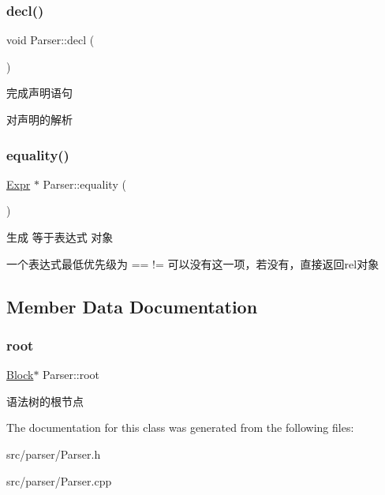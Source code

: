 \subsubsection{\texorpdfstring{decl()}{decl()}}
{\footnotesize\ttfamily void Parser\+::decl (\begin{DoxyParamCaption}{ }\end{DoxyParamCaption})\hspace{0.3cm}{\ttfamily [protected]}}



完成声明语句 

对声明的解析 \mbox{\label{class_parser_acf81bd28478a78855da7271b0dd7a09d}} 
\subsubsection{\texorpdfstring{equality()}{equality()}}
{\footnotesize\ttfamily \hyperlink{class_expr}{Expr} $\ast$ Parser\+::equality (\begin{DoxyParamCaption}{ }\end{DoxyParamCaption})\hspace{0.3cm}{\ttfamily [protected]}}



生成 等于表达式 对象 

一个表达式最低优先级为 == != 可以没有这一项，若没有，直接返回rel对象

\subsection{Member Data Documentation}
\mbox{\label{class_parser_a2c2aa893bb15b76ceea0330cad0c75cb}} 
\subsubsection{\texorpdfstring{root}{root}}
{\footnotesize\ttfamily \hyperlink{class_block}{Block}$\ast$ Parser\+::root\hspace{0.3cm}{\ttfamily [protected]}}

语法树的根节点 

The documentation for this class was generated from the following files\+:\begin{DoxyCompactItemize}
\item 
src/parser/Parser.\+h\item 
src/parser/Parser.\+cpp\end{DoxyCompactItemize}
